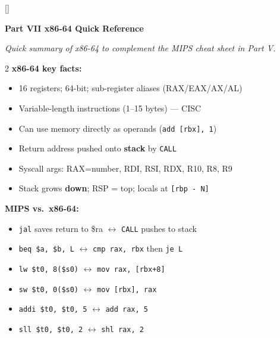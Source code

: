 \documentclass[11pt, letterpaper]{article}
\newcommand{\purplesections}{%
  \titleformat{\section}{\large\bfseries\color{sectionpurple}}{}{0em}{}[\color{sectionpurple}\titlerule]%
  \titleformat{\subsection}{\normalsize\bfseries\color{sectionpurple!80!black}}{}{0em}{}%
}
\newcommand{\partbanner}[3]{%
  \begin{tcolorbox}[colback=#1, colframe=#2, boxrule=1.2pt, arc=4pt,
    left=8pt, right=8pt, top=6pt, bottom=6pt]
    \begin{center}{\LARGE\bfseries #3}\end{center}
  \end{tcolorbox}%
}
\begin{document}
\newpage

\purplesections
{}
\partbanner{part3bg}{sectionpurple}{Part VII \quad x86-64 Quick Reference}

\vspace{4pt}
\begin{center}\small\itshape Quick summary of x86-64 to complement the MIPS cheat sheet in Part V.\end{center}
\vspace{4pt}

\begin{tcolorbox}[colback=part6bg, colframe=sectionred,
  title={\bfseries x86-64 vs.\ MIPS at a Glance}, arc=3pt, boxrule=1pt]
\footnotesize
\begin{multicols}{2}
\textbf{x86-64 key facts:}
\begin{itemize}[noitemsep, leftmargin=*]
  \item 16 registers; 64-bit; sub-register aliases (RAX/EAX/AX/AL)
  \item Variable-length instructions (1--15 bytes) --- CISC
  \item Can use memory directly as operands (\texttt{add [rbx], 1})
  \item Return address pushed onto \textbf{stack} by \texttt{CALL}
  \item Syscall args: RAX=number, RDI, RSI, RDX, R10, R8, R9
  \item Stack grows \textbf{down}; RSP = top; locals at \texttt{[rbp - N]}
\end{itemize}
\columnbreak
\textbf{MIPS vs.\ x86-64:}
\begin{itemize}[noitemsep, leftmargin=*]
  \item \texttt{jal} saves return to \$ra $\leftrightarrow$ \texttt{CALL} pushes to stack
  \item \texttt{beq \$a, \$b, L} $\leftrightarrow$ \texttt{cmp rax, rbx} then \texttt{je L}
  \item \texttt{lw \$t0, 8(\$s0)} $\leftrightarrow$ \texttt{mov rax, [rbx+8]}
  \item \texttt{sw \$t0, 0(\$s0)} $\leftrightarrow$ \texttt{mov [rbx], rax}
  \item \texttt{addi \$t0, \$t0, 5} $\leftrightarrow$ \texttt{add rax, 5}
  \item \texttt{sll \$t0, \$t0, 2} $\leftrightarrow$ \texttt{shl rax, 2}
\end{itemize}
\end{multicols}
\end{tcolorbox}
\end{document}
